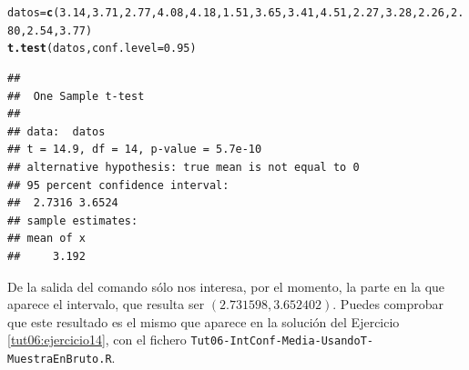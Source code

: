 \documentclass[10pt,a4paper]{article}\usepackage[]{graphicx}\usepackage[]{color}
\makeatletter
\newcommand{\hlnum}[1]{\textcolor[rgb]{0.686,0.059,0.569}{#1}}%
\newcommand{\hlstd}[1]{\textcolor[rgb]{0.345,0.345,0.345}{#1}}%
\newcommand{\hlkwb}[1]{\textcolor[rgb]{0.69,0.353,0.396}{#1}}%
\newcommand{\hlkwc}[1]{\textcolor[rgb]{0.333,0.667,0.333}{#1}}%
\newcommand{\hlkwd}[1]{\textcolor[rgb]{0.737,0.353,0.396}{\textbf{#1}}}%
\newenvironment{kframe}{%
 \def\at@end@of@kframe{}%
 \ifinner\ifhmode%
  \def\at@end@of@kframe{\end{minipage}}%
  \begin{minipage}{\columnwidth}%
 \fi\fi%
 \def\FrameCommand##1{\hskip\@totalleftmargin \hskip-\fboxsep
 \colorbox{shadecolor}{##1}\hskip-\fboxsep
     \hskip-\linewidth \hskip-\@totalleftmargin \hskip\columnwidth}%
 \MakeFramed {\advance\hsize-\width
   \@totalleftmargin\z@ \linewidth\hsize
   \@setminipage}}%
 {\par\unskip\endMakeFramed%
 \at@end@of@kframe}
\newenvironment{knitrout}{}{} %
\makeatother
\begin{document}
\begin{knitrout}
\color{fgcolor}\begin{kframe}
\begin{alltt}
\hlstd{datos}\hlkwb{=}\hlkwd{c}\hlstd{(}\hlnum{3.14}\hlstd{,}\hlnum{3.71}\hlstd{,}\hlnum{2.77}\hlstd{,}\hlnum{4.08}\hlstd{,}\hlnum{4.18}\hlstd{,}\hlnum{1.51}\hlstd{,}\hlnum{3.65}\hlstd{,}\hlnum{3.41}\hlstd{,}\hlnum{4.51}\hlstd{,}\hlnum{2.27}\hlstd{,}\hlnum{3.28}\hlstd{,}\hlnum{2.26}\hlstd{,}\hlnum{2.80}\hlstd{,}\hlnum{2.54}\hlstd{,}\hlnum{3.77}\hlstd{)}
\hlkwd{t.test}\hlstd{(datos,} \hlkwc{conf.level}\hlstd{=}\hlnum{0.95}\hlstd{)}
\end{alltt}
\begin{verbatim}
## 
## 	One Sample t-test
## 
## data:  datos
## t = 14.9, df = 14, p-value = 5.7e-10
## alternative hypothesis: true mean is not equal to 0
## 95 percent confidence interval:
##  2.7316 3.6524
## sample estimates:
## mean of x 
##     3.192
\end{verbatim}
\end{kframe}
\end{knitrout}
De la salida del comando sólo nos interesa, por el momento, la parte en la que aparece el intervalo, que resulta ser $(2.731598, 3.652402)$.  Puedes comprobar que este resultado es el mismo que aparece en la solución del Ejercicio \ref{tut06:ejercicio14}, con el fichero {\tt Tut06-IntConf-Media-UsandoT-MuestraEnBruto.R}.
\end{document}
